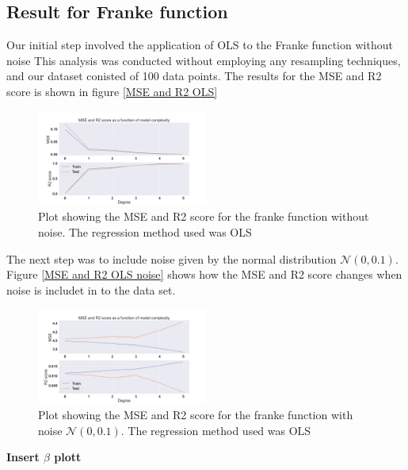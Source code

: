 \thispagestyle{plain}
\subsection{Result for Franke function}
\noindent Our initial step involved the application of OLS to the Franke function without noise
This analysis was conducted without employing any resampling techniques, 
and our dataset conisted of 100 data points. The results for the MSE and R2 score is shown in 
figure \eqref{MSE and R2 OLS}

\begin{figure}[h]
	\centering
	\includegraphics[width=0.5\textwidth]{Figure_3.png}
	\caption{Plot showing the MSE and R2 score for the franke function without noise. The regression method used was OLS}
	\label{MSE and R2 OLS}
\end{figure}
\noindent The next step was to include noise given by the normal distribution $\mathcal{N}(0,0.1)$. Figure \eqref{MSE and R2 OLS noise} shows
how the MSE and R2 score changes when noise is includet in to the data set.
\begin{figure}[h]
	\centering
	\includegraphics[width=0.5\textwidth]{Figure_4.png}
	\caption{Plot showing the MSE and R2 score for the franke function with noise $\mathcal{N}(0,0.1)$. The regression method used was OLS}
	\label{MSE and R2 OLS noise}
\end{figure}
\newline \newline
\textbf{Insert $\beta$ plott}
\newline \newline

